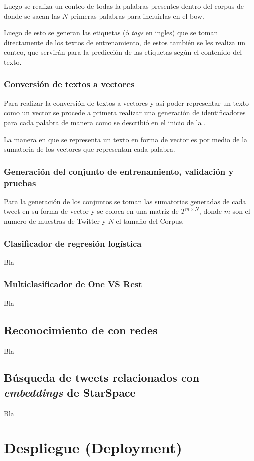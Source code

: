 Luego se realiza un conteo de todas la palabras presentes dentro del corpus de donde se sacan las $N$ primeras palabras para incluirlas en el \gls{bow}.

Luego de esto se generan las etiquetas (\'o \emph{tags} en ingles) que se toman directamente de los textos de entrenamiento, de estos también se les realiza un conteo, que servirán para la predicción de las etiquetas según el contenido del texto.

\subsubsection{Conversión de textos a vectores}
Para realizar la conversión de textos a vectores y así poder representar un texto como un vector se procede a primera realizar una generación de identificadores para cada palabra de manera como se describió en el inicio de la .

La manera en que se representa un texto en forma de vector es por medio de la sumatoria de los vectores que representan cada palabra.

\subsubsection{Generación del conjunto de entrenamiento, validación y pruebas}
Para la generación de los conjuntos se toman las sumatorias generadas de cada tweet en su forma de vector y se coloca en una matriz de $T^{m \times N}$, donde $m$ son el numero de muestras de Twitter y $N$ el tamaño del Corpus.

\subsubsection{Clasificador de regresión logística}
 Bla

\subsubsection{Multiclasificador de One VS Rest}
 Bla


\subsection{Reconocimiento de  con redes }
 Bla

\subsection{Búsqueda de tweets relacionados con \emph{embeddings} de StarSpace}
 Bla


\section{Despliegue (Deployment)}
